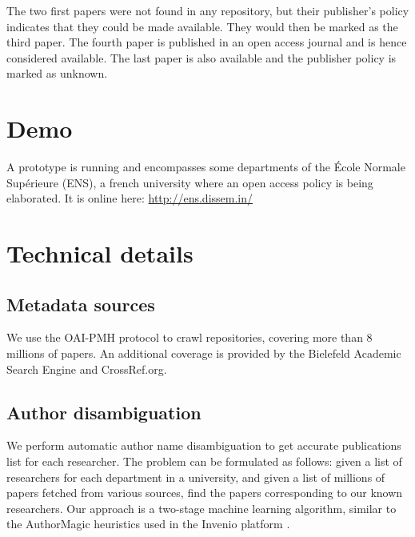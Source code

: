 \documentclass[a4paper]{article}
\begin{document}
The two first papers were not found in any repository, but their
publisher's policy indicates that they could be made available. They
would then be marked as the third paper. The fourth paper is published
in an open access journal and is hence considered available. The last
paper is also available and the publisher policy is marked as unknown.

\section{Demo}

A prototype is running and encompasses some departments of the École
Normale Supérieure (ENS), a french university where an open access policy
is being elaborated. It is online here:
\url{http://ens.dissem.in/}

\section{Technical details}

\subsection{Metadata sources}

We use the OAI-PMH \cite{oaipmh} protocol to crawl repositories, covering more
than 8 millions of papers. An additional coverage is provided by the Bielefeld
Academic Search Engine \cite{lossau2006bielefeld} and CrossRef.org.

\subsection{Author disambiguation}

We perform automatic author name disambiguation to get accurate
publications list for each researcher. The problem can be formulated as
follows: given a list of researchers for each department in a
university, and given a list of millions of papers fetched from various
sources, find the papers corresponding to our known researchers. Our
approach is a two-stage machine learning algorithm, similar to the AuthorMagic heuristics
used in the Invenio platform \cite{weiler2011authormagic}.



\end{document}
